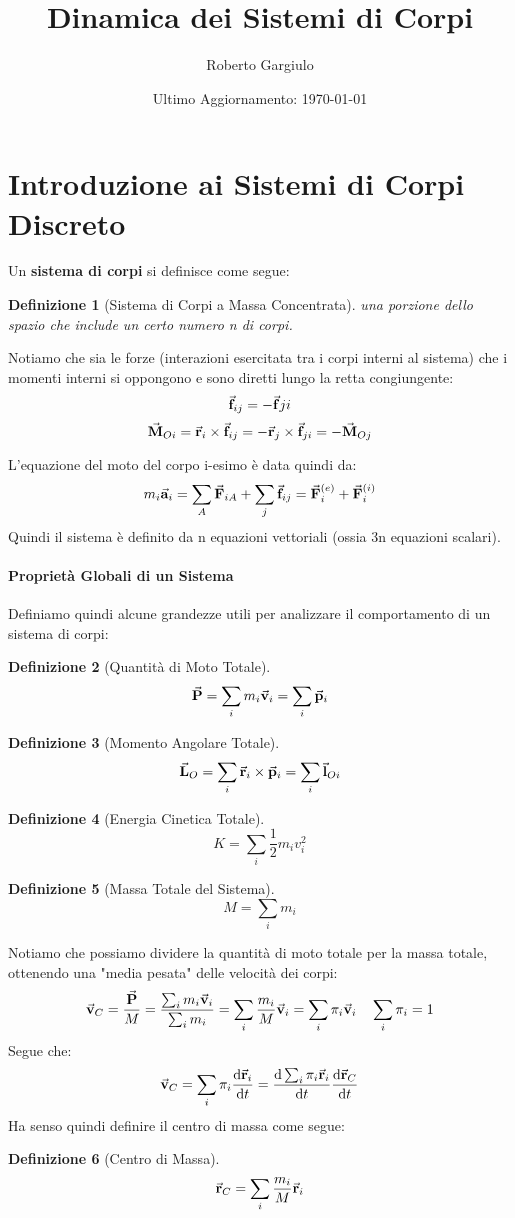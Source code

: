 \documentclass{article}
\title{Dinamica dei Sistemi di Corpi}
\author{Roberto Gargiulo}
\date{Ultimo Aggiornamento: \today}
\newtheorem{defn}{Definizione}[section]
\renewcommand{\a}{\va{a}}
\renewcommand{\v}{\va{v}}
\renewcommand{\r}{\va{r}}
\newcommand{\F}{\va{F}}
\newcommand{\f}{\va{f}}
\newcommand{\M}{\va{M}}
\renewcommand{\l}{\va{l}}
\newcommand{\p}{\va{p}}
\renewcommand{\P}{\va{P}}
\renewcommand{\L}{\va{L}}
\begin{document}
\maketitle

\section{Introduzione ai Sistemi di Corpi Discreto}

Un \textbf{sistema di corpi} si definisce come segue:
\begin{defn}[Sistema di Corpi a Massa Concentrata]
una porzione dello spazio che include un certo numero n di corpi.
\end{defn}
Notiamo che sia le forze (interazioni esercitata tra i corpi interni al sistema) che i momenti interni si oppongono e sono diretti lungo la retta congiungente:
\[\f_{ij}=-\f{ji}\]
\[\M_{Oi}=\r_i\times\f_{ij}=-\r_j\times\f_{ji}=-\M_{Oj}\]

L'equazione del moto del corpo i-esimo è data quindi da:
\begin{equation}
    m_i\a_i=\sum_A\F_{iA}+\sum_j\f_{ij}=\F_i^{(e)}+\F_i^{(i)}
\end{equation}
Quindi il sistema è definito da n equazioni vettoriali (ossia 3n equazioni scalari).

\paragraph{Proprietà Globali di un Sistema}
Definiamo quindi alcune grandezze utili per analizzare il comportamento di un sistema di corpi:
\begin{defn}[Quantità di Moto Totale]
\[\P=\sum_im_i\v_i=\sum_i\p_i\]
\end{defn}
\begin{defn}[Momento Angolare Totale]
\[\L_O=\sum_i\r_i\times\p_i=\sum_i\l_{Oi}\]
\end{defn}
\begin{defn}[Energia Cinetica Totale]
\[K=\sum_i\frac{1}{2}m_iv_i^2\]
\end{defn}
\begin{defn}[Massa Totale del Sistema]
\[M=\sum_im_i\]
\end{defn}
Notiamo che possiamo dividere la quantità di moto totale per la massa totale, ottenendo una "media pesata" delle velocità dei corpi:
\[\v_C=\frac{\P}{M}=\frac{\sum_im_i\v_i}{\sum_im_i}=\sum_i\frac{m_i}{M}\v_i=\sum_i\pi_i\v_i\quad\sum_i\pi_i=1\]
Segue che:
\[\v_C=\sum_i\pi_i\dv{\r_i}{t}=\dv{\sum_i\pi_i\r_i}{t}\dv{\r_C}{t}\]
Ha senso quindi definire il centro di massa come segue:
\begin{defn}[Centro di Massa]
\[\r_C=\sum_i\frac{m_i}{M}\r_i\]
\end{defn}
\end{document}
